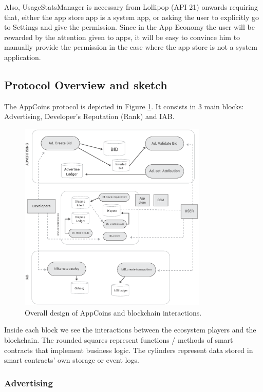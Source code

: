 Also, UsageStatsManager is necessary from Lollipop (API 21) onwards requiring that, either the app 
store app is a system app, or asking the user to explicitly go to Settings and give the permission. Since 
in the App Economy the user will be rewarded by the attention given to apps, it will be easy to convince 
him to manually provide the permission in the case where the app store is not a system application.


\subsection{Protocol Overview and sketch}


The AppCoins protocol is depicted in Figure \ref{fig:design}. It consists in 3 main blocks: Advertising, 
Developer's Reputation (Rank) and IAB.

\begin{figure}[!ht]
\centering
\includegraphics[width=0.8\textwidth]{diagrams/design.eps}
\caption{Overall design of AppCoins and blockchain interactions.}
\label{fig:design}
\end{figure}

Inside each block we see the interactions between the ecosystem players and the blockchain. The 
rounded squares represent functions / methods of smart contracts that implement business logic. The 
cylinders represent data stored in smart contracts' own storage or event logs.

\subsubsection{Advertising}

